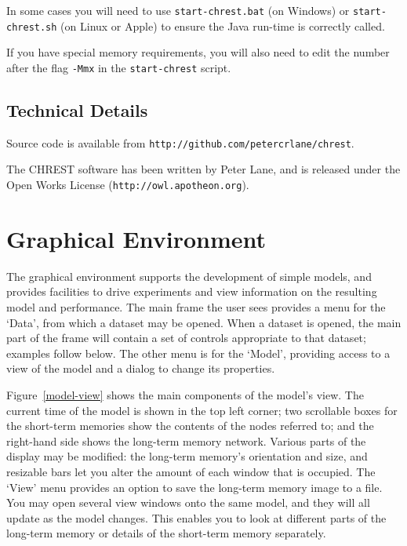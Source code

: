 \documentclass{article}
\begin{document}
In some cases you will need to use {\tt start-chrest.bat} (on Windows) or 
{\tt start-chrest.sh} (on Linux or Apple) to ensure the Java run-time is correctly 
called.

If you have special memory requirements, you will also need to edit the number 
after the flag {\tt -Mmx} in the {\tt start-chrest} script. 

\subsection{Technical Details}

Source code is available from {\tt http://github.com/petercrlane/chrest}.

\noindent The CHREST software has been written by Peter Lane, and is released
under the Open Works License ({\tt http://owl.apotheon.org}).


\section{Graphical Environment}

The graphical environment supports the development of simple models, and
provides facilities to drive experiments and view information on the resulting
model and performance.  The main frame the user sees provides a menu for the
`Data', from which a dataset may be opened.  When a dataset is opened, the main
part of the frame will contain a set of controls appropriate to that dataset;
examples follow below.  The other menu is for the `Model', providing access to
a view of the model and a dialog to change its properties.

Figure~\ref{model-view} shows the main components of the model's view.  The
current time of the model is shown in the top left corner; two scrollable boxes
for the short-term memories show the contents of the nodes referred to; and the
right-hand side shows the long-term memory network.  Various parts of the
display may be modified: the long-term memory's orientation and size, and
resizable bars let you alter the amount of each window that is occupied.  The
`View' menu provides an option to save the long-term memory image to a file.
You may open several view windows onto the same model, and they will all update
as the model changes.  This enables you to look at different parts of the
long-term memory or details of the short-term memory separately.
\end{document}
